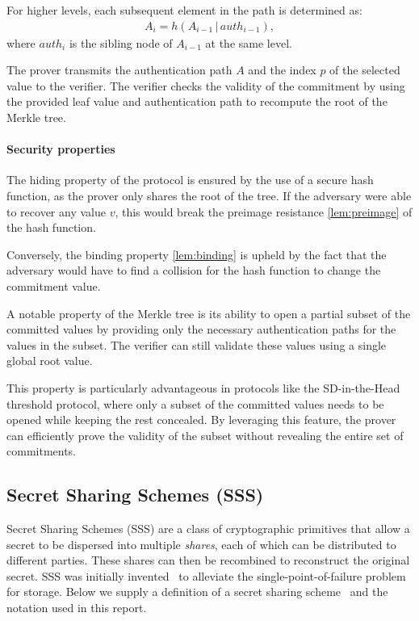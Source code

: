 \documentclass[11pt]{report}
\theoremstyle{definition}
\theoremstyle{plain}
\begin{document}
For higher levels, each subsequent element in the path is determined as:
\begin{align*}
  A_i = h(A_{i-1} \, | \, auth_{i-1}),
\end{align*}
where $auth_i$ is the sibling node of $A_{i-1}$ at the same level.

The prover transmits the authentication path $A$ and the index $p$ of the selected value to the verifier. The verifier checks the validity of the commitment by using the provided leaf value and authentication path to recompute the root of the Merkle tree.

\paragraph{Security properties}

The hiding property of the protocol is ensured by the use of a secure hash function, as the prover only shares the root of the tree. If the adversary were able to recover any value $v$, this would break the preimage resistance \autoref{lem:preimage} of the hash function.

Conversely, the binding property \autoref{lem:binding} is upheld by the fact that the adversary would have to find a collision for the hash function to change the commitment value.

A notable property of the Merkle tree is its ability to open a partial subset of the committed values by providing only the necessary authentication paths for the values in the subset. The verifier can still validate these values using a single global root value.

This property is particularly advantageous in protocols like the SD-in-the-Head threshold protocol, where only a subset of the committed values needs to be opened while keeping the rest concealed. By leveraging this feature, the prover can efficiently prove the validity of the subset without revealing the entire set of commitments.

\subsection{Secret Sharing Schemes (SSS)}

Secret Sharing Schemes (SSS) are a class of cryptographic primitives that allow a secret to be dispersed into multiple \textit{shares}, each of which can be distributed to different parties. These shares can then be recombined to reconstruct the original secret. SSS was initially invented~\cite{shamir1979share} to alleviate the single-point-of-failure problem for storage. Below we supply a definition of a secret sharing scheme~\cite{cramer2015secure} and the notation used in this report.
\end{document}
